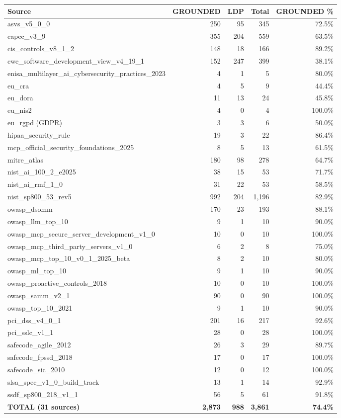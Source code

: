 \documentclass[
]{article}
\begin{document}
\begin{longtable}[]{@{}lrrrr@{}}
\toprule\noalign{}
Source & GROUNDED & LDP & Total & GROUNDED \% \\
\midrule\noalign{}
\endhead
\bottomrule\noalign{}
\endlastfoot
asvs\_v5\_0\_0 & 250 & 95 & 345 & 72.5\% \\
capec\_v3\_9 & 355 & 204 & 559 & 63.5\% \\
cis\_controls\_v8\_1\_2 & 148 & 18 & 166 & 89.2\% \\
cwe\_software\_development\_view\_v4\_19\_1 & 152 & 247 & 399 &
38.1\% \\
enisa\_multilayer\_ai\_cybersecurity\_practices\_2023 & 4 & 1 & 5 &
80.0\% \\
eu\_cra & 4 & 5 & 9 & 44.4\% \\
eu\_dora & 11 & 13 & 24 & 45.8\% \\
eu\_nis2 & 4 & 0 & 4 & 100.0\% \\
eu\_rgpd (GDPR) & 3 & 3 & 6 & 50.0\% \\
hipaa\_security\_rule & 19 & 3 & 22 & 86.4\% \\
mcp\_official\_security\_foundations\_2025 & 8 & 5 & 13 & 61.5\% \\
mitre\_atlas & 180 & 98 & 278 & 64.7\% \\
nist\_ai\_100\_2\_e2025 & 38 & 15 & 53 & 71.7\% \\
nist\_ai\_rmf\_1\_0 & 31 & 22 & 53 & 58.5\% \\
nist\_sp800\_53\_rev5 & 992 & 204 & 1,196 & 82.9\% \\
owasp\_dsomm & 170 & 23 & 193 & 88.1\% \\
owasp\_llm\_top\_10 & 9 & 1 & 10 & 90.0\% \\
owasp\_mcp\_secure\_server\_development\_v1\_0 & 10 & 0 & 10 &
100.0\% \\
owasp\_mcp\_third\_party\_servers\_v1\_0 & 6 & 2 & 8 & 75.0\% \\
owasp\_mcp\_top\_10\_v0\_1\_2025\_beta & 8 & 2 & 10 & 80.0\% \\
owasp\_ml\_top\_10 & 9 & 1 & 10 & 90.0\% \\
owasp\_proactive\_controls\_2018 & 10 & 0 & 10 & 100.0\% \\
owasp\_samm\_v2\_1 & 90 & 0 & 90 & 100.0\% \\
owasp\_top\_10\_2021 & 9 & 1 & 10 & 90.0\% \\
pci\_dss\_v4\_0\_1 & 201 & 16 & 217 & 92.6\% \\
pci\_sslc\_v1\_1 & 28 & 0 & 28 & 100.0\% \\
safecode\_agile\_2012 & 26 & 3 & 29 & 89.7\% \\
safecode\_fpssd\_2018 & 17 & 0 & 17 & 100.0\% \\
safecode\_sic\_2010 & 12 & 0 & 12 & 100.0\% \\
slsa\_spec\_v1\_0\_build\_track & 13 & 1 & 14 & 92.9\% \\
ssdf\_sp800\_218\_v1\_1 & 56 & 5 & 61 & 91.8\% \\
\textbf{TOTAL (31 sources)} & \textbf{2,873} & \textbf{988} &
\textbf{3,861} & \textbf{74.4\%} \\
\end{longtable}
\end{document}
